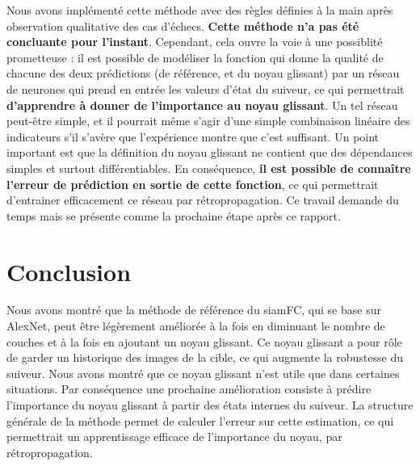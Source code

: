 \documentclass[10pt,twocolumn,letterpaper,french]{article}
\begin{document}
Nous avons implémenté cette méthode avec des règles définies à la main après observation qualitative des cas d'échecs. \textbf{Cette méthode n'a pas été concluante pour l'instant}. Cependant, cela ouvre la voie à une possiblité prometteuse : il est possible de modéliser la fonction qui donne la qualité de chacune des deux prédictions (de référence, et du noyau glissant) par un réseau de neurones qui prend en entrée les valeurs d'état du suiveur, ce qui permettrait \textbf{d'apprendre à donner de l'importance au noyau glissant}. Un tel réseau peut-être simple, et il pourrait même s'agir d'une simple combinaison linéaire des indicateurs s'il s'avère que l'expérience montre que c'est suffisant. Un point important est que la définition du noyau glissant ne contient que des dépendances simples et surtout différentiables. En conséquence, \textbf{il est possible de connaître l'erreur de prédiction en sortie de cette fonction}, ce qui permettrait d'entrainer efficacement ce réseau par rétropropagation. Ce travail demande du temps mais se présente comme la prochaine étape après ce rapport.

\section*{Conclusion}

Nous avons montré que la méthode de référence du siamFC, qui se base sur AlexNet, peut être légèrement améliorée à la fois en diminuant le nombre de couches et à la fois en ajoutant un noyau glissant. Ce noyau glissant a pour rôle de garder un historique des images de la cible, ce qui augmente la robustesse du suiveur. Nous avons montré que ce noyau glissant n'est utile que dans certaines situations. Par conséquence une prochaine amélioration consiste à prédire l'importance du noyau glissant à partir des états internes du suiveur. La structure générale de la méthode permet de calculer l'erreur sur cette estimation, ce qui permettrait un apprentissage efficace de l'importance du noyau, par rétropropagation.


{\small


}

\clearpage
\onecolumn
\end{document}
